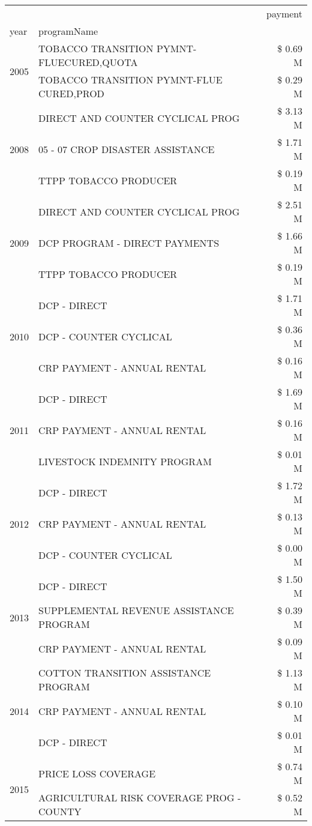 \begin{tabular}{llr}
\toprule
 &  & payment \\
year & programName &  \\
\midrule
\multirow[t]{2}{*}{2005} & TOBACCO TRANSITION PYMNT-FLUECURED,QUOTA & \$ 0.69 M \\
 & TOBACCO TRANSITION PYMNT-FLUE CURED,PROD & \$ 0.29 M \\
\cline{1-3}
\multirow[t]{3}{*}{2008} & DIRECT AND COUNTER CYCLICAL PROG & \$ 3.13 M \\
 & 05 - 07 CROP DISASTER ASSISTANCE & \$ 1.71 M \\
 & TTPP TOBACCO PRODUCER & \$ 0.19 M \\
\cline{1-3}
\multirow[t]{3}{*}{2009} & DIRECT AND COUNTER CYCLICAL PROG & \$ 2.51 M \\
 & DCP PROGRAM - DIRECT PAYMENTS & \$ 1.66 M \\
 & TTPP TOBACCO PRODUCER & \$ 0.19 M \\
\cline{1-3}
\multirow[t]{3}{*}{2010} & DCP - DIRECT & \$ 1.71 M \\
 & DCP - COUNTER CYCLICAL & \$ 0.36 M \\
 & CRP PAYMENT - ANNUAL RENTAL & \$ 0.16 M \\
\cline{1-3}
\multirow[t]{3}{*}{2011} & DCP - DIRECT & \$ 1.69 M \\
 & CRP PAYMENT - ANNUAL RENTAL & \$ 0.16 M \\
 & LIVESTOCK INDEMNITY PROGRAM & \$ 0.01 M \\
\cline{1-3}
\multirow[t]{3}{*}{2012} & DCP - DIRECT & \$ 1.72 M \\
 & CRP PAYMENT - ANNUAL RENTAL & \$ 0.13 M \\
 & DCP - COUNTER CYCLICAL & \$ 0.00 M \\
\cline{1-3}
\multirow[t]{3}{*}{2013} & DCP - DIRECT & \$ 1.50 M \\
 & SUPPLEMENTAL REVENUE ASSISTANCE PROGRAM & \$ 0.39 M \\
 & CRP PAYMENT - ANNUAL RENTAL & \$ 0.09 M \\
\cline{1-3}
\multirow[t]{3}{*}{2014} & COTTON TRANSITION ASSISTANCE PROGRAM & \$ 1.13 M \\
 & CRP PAYMENT - ANNUAL RENTAL & \$ 0.10 M \\
 & DCP - DIRECT & \$ 0.01 M \\
\cline{1-3}
\multirow[t]{3}{*}{2015} & PRICE LOSS COVERAGE & \$ 0.74 M \\
 & AGRICULTURAL RISK COVERAGE PROG - COUNTY & \$ 0.52 M \\

\end{tabular}
